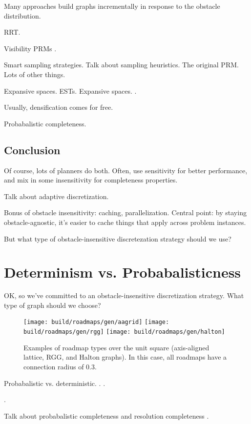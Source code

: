 Many approaches build graphs incrementally in response to the
obstacle distribution.

RRT.

Visibility PRMs \citep{simeon2000visibilityprms}.

Smart sampling strategies.
Talk about sampling heuristics.
The original PRM.
Lots of other things.

Expansive spaces.
ESTs. Expansive spaces. \citep{hsu1997expansive}.

Usually, densification comes for free.

Probabalistic completeness.

\subsection{Conclusion}

Of course, lots of planners do both.
Often, use sensitivity for better performance,
and mix in some insensitivity for completeness properties.

Talk about adaptive discretization.

Bonus of obstacle insensitivity: caching, parallelization.
Central point: by staying obstacle-agnostic, it's easier to cache
things that apply across problem instances.

But what type of obstacle-insensitive discretezation strategy should
we use?

\section{Determinism vs. Probabalisticness}

OK, so we've committed to an obstacle-insensitive discretization
strategy.
What type of graph should we choose?

\begin{figure}
   \centering
   \texttt{[image: build/roadmaps/gen/aagrid]}
   \texttt{[image: build/roadmaps/gen/rgg]}
   \texttt{[image: build/roadmaps/gen/halton]}
   \caption{Examples of roadmap types over the unit square
      (axis-aligned lattice, RGG, and Halton graphs).
      In this case, all roadmaps have a connection radius of 0.3.}
\end{figure}

Probabalistic vs. deterministic.
\citep{branicky2002detvsprobroadmaps}.
\citep{lavalle2002gridprms}.

\citep{janson2015deterministicsampling}.

Talk about probabalistic completeness and resolution completeness
\citep{cheng2004rescomplete}.

